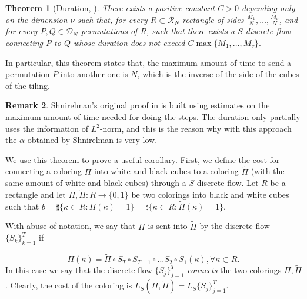 \documentclass[12 pt]{article}
\theoremstyle{definition} \newtheorem{definition}{Definition}[section]
\theoremstyle{definition} \newtheorem{remark}[definition]{Remark}
\theoremstyle{plain} \newtheorem{lemma}[definition]{Lemma}
\theoremstyle{plain} \newtheorem{proposition}[definition]{Proposition}
\theoremstyle{plain} \newtheorem{theorem}[definition]{Theorem}
\theoremstyle{plain} \newtheorem{corollary}[definition]{Corollary}
\theoremstyle{definition} \newtheorem{example}[definition]{Example}
\theoremstyle{definition} \newtheorem{assumption}[definition]{Assumption}
\theoremstyle{definition} \newtheorem{conjecture}[definition]{Conjecture}
\newcommand{\1}{\mathbbm 1}
\numberwithin{equation}{section}
\begin{document}
\begin{theorem}[Duration, \cite{Shnirelman}]\label{thm:duration}
    There exists a positive constant $C>0$ depending only on the dimension $\nu$ such that, for every $R\subset\mathcal{R}_N$  rectangle of sides $\frac{M_1}{N},\dots,\frac{M_\nu}{N}$, and for every $P,Q\in\mathcal{D}_N$ permutations of $R$, such that there exists a $S$-discrete flow connecting $P$ to $Q$ whose duration does not exceed $C\max\lbrace M_1,\dots,M_\nu\rbrace.$
\end{theorem}
In particular, this theorem states that, the maximum amount of time to send a permutation $P$ into another one is $N$, which is the inverse of the side of the cubes of the tiling. 
\begin{remark}
    Shnirelman's original proof in \cite{Shnirelman} is built using estimates on the maximum amount of time needed for doing the steps. The duration only partially uses the information of $L^2$-norm, and this is the reason why with this approach the $\alpha$ obtained by Shnirelman is very low.
\end{remark}
We use this theorem to prove a useful corollary. First, we define the cost for connecting a coloring $\Pi$ into white and black cubes to a coloring $\tilde \Pi$ (with  the same amount of white and black cubes) through a $S$-discrete flow.
Let $R$ be a rectangle and let $\Pi,\tilde \Pi:R\rightarrow\lbrace0,1\rbrace$ be two colorings into black and white cubes such that
$b=\sharp\lbrace\kappa\subset R:\Pi(\kappa)=1\rbrace=\sharp\lbrace\kappa\subset R:\tilde\Pi(\kappa)=1\rbrace.$

With abuse of notation, we say that $\Pi$ is sent into $\tilde\Pi$ by the discrete flow $\lbrace S_k\rbrace_{k=1}^T$ if
 
\begin{equation*}
    \Pi(\kappa)=\tilde\Pi\circ S_T\circ S_{T-1}\circ \dots S_2 \circ S_1 (\kappa),\forall\kappa\subset R.
\end{equation*}
In this case we say that the discrete flow $\lbrace S_j\rbrace_{j=1}^T$ \emph{connects} the two colorings $\Pi,\tilde\Pi$. Clearly, the cost of the coloring is $L_S(\Pi,\tilde\Pi)=L_S\lbrace S_j\rbrace_{j=1}^T.$
\end{document}
